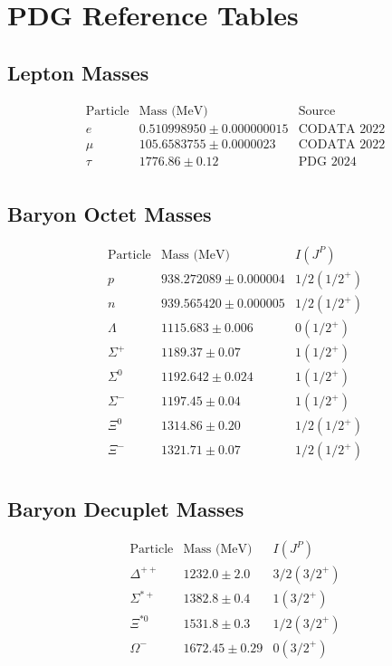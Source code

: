 \chapter{PDG Reference Tables}
\label{app:pdg_tables}

\section{Lepton Masses}

\[
\begin{array}{ccc}
\text{Particle} & \text{Mass (MeV)} & \text{Source} \\
\hline
e & 0.510998950 \pm 0.000000015 & \text{CODATA 2022} \\
\mu & 105.6583755 \pm 0.0000023 & \text{CODATA 2022} \\
\tau & 1776.86 \pm 0.12 & \text{PDG 2024} \\
\end{array}
\]

\section{Baryon Octet Masses}

\[
\begin{array}{ccc}
\text{Particle} & \text{Mass (MeV)} & I(J^P) \\
\hline
p & 938.272089 \pm 0.000004 & 1/2(1/2^+) \\
n & 939.565420 \pm 0.000005 & 1/2(1/2^+) \\
\Lambda & 1115.683 \pm 0.006 & 0(1/2^+) \\
\Sigma^+ & 1189.37 \pm 0.07 & 1(1/2^+) \\
\Sigma^0 & 1192.642 \pm 0.024 & 1(1/2^+) \\
\Sigma^- & 1197.45 \pm 0.04 & 1(1/2^+) \\
\Xi^0 & 1314.86 \pm 0.20 & 1/2(1/2^+) \\
\Xi^- & 1321.71 \pm 0.07 & 1/2(1/2^+) \\
\end{array}
\]

\section{Baryon Decuplet Masses}

\[
\begin{array}{ccc}
\text{Particle} & \text{Mass (MeV)} & I(J^P) \\
\hline
\Delta^{++} & 1232.0 \pm 2.0 & 3/2(3/2^+) \\
\Sigma^{*+} & 1382.8 \pm 0.4 & 1(3/2^+) \\
\Xi^{*0} & 1531.8 \pm 0.3 & 1/2(3/2^+) \\
\Omega^- & 1672.45 \pm 0.29 & 0(3/2^+) \\
\end{array}
\]

